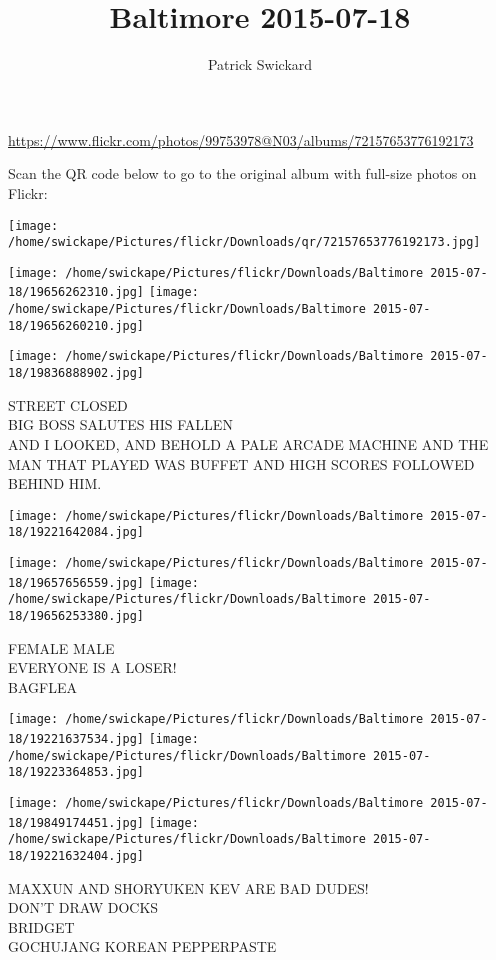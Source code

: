 \documentclass[10pt,letterpaper]{article}
\title{Baltimore 2015-07-18}
\author{Patrick Swickard}
\date{}
\begin{document}
\maketitle

\url{https://www.flickr.com/photos/99753978@N03/albums/72157653776192173}

Scan the QR code below to go to the original album with full-size photos on Flickr:

\texttt{[image: /home/swickape/Pictures/flickr/Downloads/qr/72157653776192173.jpg]}
\pagebreak

\texttt{[image: /home/swickape/Pictures/flickr/Downloads/Baltimore 2015-07-18/19656262310.jpg]}
\texttt{[image: /home/swickape/Pictures/flickr/Downloads/Baltimore 2015-07-18/19656260210.jpg]}

\vspace{0.25in}
\texttt{[image: /home/swickape/Pictures/flickr/Downloads/Baltimore 2015-07-18/19836888902.jpg]}

STREET CLOSED\\
BIG BOSS SALUTES HIS FALLEN\\
AND I LOOKED, AND BEHOLD A PALE ARCADE MACHINE AND THE MAN THAT PLAYED WAS BUFFET AND HIGH SCORES FOLLOWED BEHIND HIM.
\pagebreak

\texttt{[image: /home/swickape/Pictures/flickr/Downloads/Baltimore 2015-07-18/19221642084.jpg]}

\vspace{0.25in}
\texttt{[image: /home/swickape/Pictures/flickr/Downloads/Baltimore 2015-07-18/19657656559.jpg]}
\texttt{[image: /home/swickape/Pictures/flickr/Downloads/Baltimore 2015-07-18/19656253380.jpg]}

FEMALE MALE\\
EVERYONE IS A LOSER!\\
BAGFLEA
\pagebreak

\texttt{[image: /home/swickape/Pictures/flickr/Downloads/Baltimore 2015-07-18/19221637534.jpg]}
\texttt{[image: /home/swickape/Pictures/flickr/Downloads/Baltimore 2015-07-18/19223364853.jpg]}

\texttt{[image: /home/swickape/Pictures/flickr/Downloads/Baltimore 2015-07-18/19849174451.jpg]}
\texttt{[image: /home/swickape/Pictures/flickr/Downloads/Baltimore 2015-07-18/19221632404.jpg]}

MAXXUN AND SHORYUKEN KEV ARE BAD DUDES!\\
DON'T DRAW DOCKS\\
BRIDGET\\
GOCHUJANG KOREAN PEPPERPASTE
\pagebreak
\end{document}
